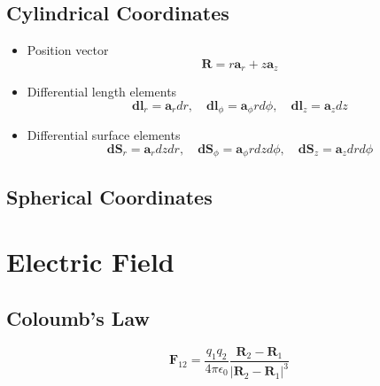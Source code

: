 \documentclass{article}
\begin{document}
    \subsection{Cylindrical Coordinates}
    \begin{definition}
        \begin{itemize}
            \item Position vector
            \begin{equation}
                \mathbf{R} = r \mathbf{a}_r + z \mathbf{a}_z
            \end{equation}
            \item Differential length elements
            \begin{equation}
                \mathbf{dl}_r = \mathbf{a}_r dr, \quad \mathbf{dl}_\phi = \mathbf{a}_\phi r d\phi, \quad \mathbf{dl}_z = \mathbf{a}_z dz
            \end{equation}
            \item Differential surface elements
            \begin{equation}
                \mathbf{dS}_r = \mathbf{a}_r dz dr, \quad \mathbf{dS}_\phi = \mathbf{a}_\phi r dz d\phi, \quad \mathbf{dS}_z = \mathbf{a}_z dr d\phi
            \end{equation}
        \end{itemize}
    \end{definition}

    \subsection{Spherical Coordinates}
    \begin{definition}
        
    \end{definition}

    \section{Electric Field}

    \subsection{Coloumb's Law}
    \begin{definition}
        \begin{equation}
            \mathbf{F}_{12} = \frac{q_1 q_2}{4\pi\epsilon_0}\frac{\mathbf{R}_2 - \mathbf{R}_1}{|\mathbf{R}_2 - \mathbf{R}_1|^3}
        \end{equation}
    \end{definition}
\end{document}
